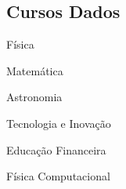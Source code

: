 \begin{CVsidebar}
{}



\dotline



\section{Cursos Dados}
\begin{itemlist}
    \item Física
    \item Matemática
    \item Astronomia
    \item Tecnologia e Inovação
    \item Educação Financeira
    \item Física Computacional
    
    
\end{itemlist}






\end{CVsidebar}